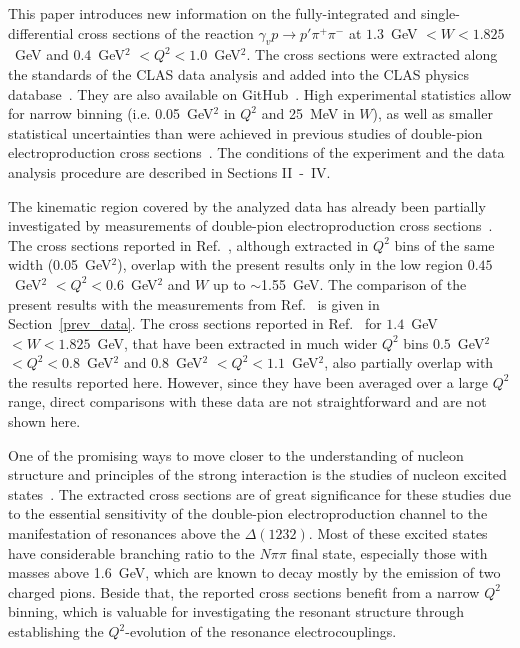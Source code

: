 \documentclass[prc,twocolumn,superscriptaddress,showpacs,amssymb,amsmath,amsfonts,aps,nofootinbib]{revtex4-1}
\begin{document}
This paper introduces new information on the fully-integrated and single-differential cross sections of the reaction  $\gamma_{v} p \rightarrow p' \pi^{+} \pi^{-}$ at $1.3$~GeV $< W < 1.825$~GeV and $0.4$~GeV$^{2}$ $< Q^{2} < 1.0$~GeV$^{2}$. The cross sections were extracted along the standards of the CLAS data analysis and added into the CLAS physics database~\cite{CLAS_DB}. They are also available on GitHub~\cite{Github:data}. High experimental statistics allow for narrow binning (i.e. 0.05~GeV$^{2}$ in $Q^{2}$ and 25~MeV in $W$), as well as smaller statistical uncertainties than were achieved in previous studies of double-pion electroproduction cross sections~\cite{Fedotov:2008aa,Ripani:2002ss,Isupov:2017lnd}. The conditions of the experiment and the data analysis procedure are described in Sections II~-~IV.




The kinematic region covered by the analyzed data has already been partially investigated by measurements of double-pion electroproduction cross sections~\cite{Ripani:2002ss,Fedotov:2008aa}.  
The cross sections reported in Ref.~\cite{Fedotov:2008aa}, although extracted in  $Q^{2}$ bins of the same width (0.05~GeV$^{2}$),  overlap with the present results only in the low region  $0.45$~GeV$^{2}$ $< Q^{2} < 0.6$~GeV$^{2}$ and $W$ up to $\sim$1.55~GeV. The comparison of the present results with the measurements from Ref.~\cite{Fedotov:2008aa} is given in Section~\ref{prev_data}.
The cross sections reported in Ref.~\cite{Ripani:2002ss} for $1.4$~GeV $< W < 1.825$~GeV, that have been extracted in much wider $Q^{2}$ bins $0.5$~GeV$^{2}$ $< Q^{2} < 0.8$~GeV$^{2}$ and $0.8$~GeV$^{2}$ $< Q^{2} < 1.1$~GeV$^{2}$, also partially overlap with the results reported here. However, since they have been averaged over a large $Q^{2}$ range, direct comparisons with these data are not straightforward and are not shown here.  


One of the promising ways to move closer to the understanding of nucleon structure and principles of the strong interaction is the studies of nucleon excited states~\cite{Burkert:2016kyi,Krusche:2003ik,Aznauryan:2011qj,Skorodumina:2016pnb}.
The extracted cross sections are of great significance for these studies due to the essential sensitivity of the double-pion electroproduction channel to the manifestation of resonances above the $\Delta(1232)$. Most of these excited states have considerable branching ratio to the $N\pi\pi$ final state, especially those with masses above 1.6~GeV, which are known to decay mostly by the emission of two charged pions. Beside that, the reported cross sections benefit from a narrow $Q^{2}$ binning, which is valuable for investigating the resonant structure  through establishing the $Q^{2}$-evolution of the resonance electrocouplings. 
\end{document}
